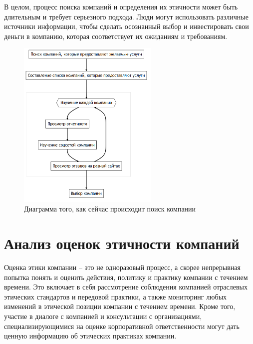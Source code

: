 \documentclass{article}
\begin{document}
В целом, процесс поиска компаний и определения их этичности может быть длительным и требует серьезного подхода. Люди могут использовать различные источники информации, чтобы сделать осознанный выбор и инвестировать свои деньги в компанию, которая соответствует их ожиданиям и требованиям.
\begin{figure}[h]
\centering
\includegraphics[width=0.6\textwidth]{img/mermaid/as_is.png}
\caption{\label{fig:as_is}Диаграмма того, как сейчас происходит поиск компании}
\end{figure}

\section{Анализ оценок этичности компаний}
\label{sec:orgaddc441}
Оценка этики компании -- это не одноразовый процесс, а скорее непрерывная попытка понять и оценить действия, политику и практику компании с течением времени. Это включает в себя рассмотрение соблюдения компанией отраслевых этических стандартов и передовой практики, а также мониторинг любых изменений в этической позиции компании с течением времени. Кроме того, участие в диалоге с компанией и консультации с организациями, специализирующимися на оценке корпоративной ответственности могут дать ценную информацию об этических практиках компании.
\end{document}

